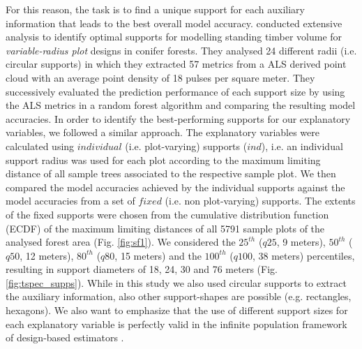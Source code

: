 For this reason, the task is to find a unique support for each auxiliary information that leads to the best overall model accuracy. \citet{deo2016} conducted extensive analysis to identify optimal supports for modelling standing timber volume for \textit{variable-radius plot} designs in conifer forests. They analysed 24 different radii (i.e. circular supports) in which they extracted 57 metrics from a ALS derived point cloud with an average point density of 18 pulses per square meter. They successively evaluated the prediction performance of each support size by using the ALS metrics in a random forest algorithm and comparing the resulting model accuracies. In order to identify the best-performing supports for our explanatory variables, we followed a similar approach. The explanatory variables were calculated using $individual$ (i.e. plot-varying) supports ($ind$), i.e. an individual support radius was used for each plot according to the maximum limiting distance of all sample trees associated to the respective sample plot. We then compared the model accuracies achieved by the individual supports against the model accuracies from a set of $fixed$ (i.e. non plot-varying) supports. The extents of the fixed supports were chosen from the cumulative distribution function (ECDF) of the maximum limiting distances of all 5791 sample plots of the analysed forest area (Fig. \ref{fig:sf1}). We considered the $25^{th}$ ($q25$, 9 meters), $50^{th}$ ($q50$, 12 meters), $80^{th}$ ($q80$, 15 meters) and the $100^{th}$ ($q100$, 38 meters) percentiles, resulting in support diameters of 18, 24, 30 and 76 meters (Fig. \ref{fig:tspec_supps}). While in this study we also used circular supports to extract the auxiliary information, also other support-shapes are possible (e.g. rectangles, hexagons). We also want to emphasize that the use of different support sizes for each explanatory variable is perfectly valid in the infinite population framework of design-based estimators \citep{mandallaz2013c, mandallaz2013a}.



